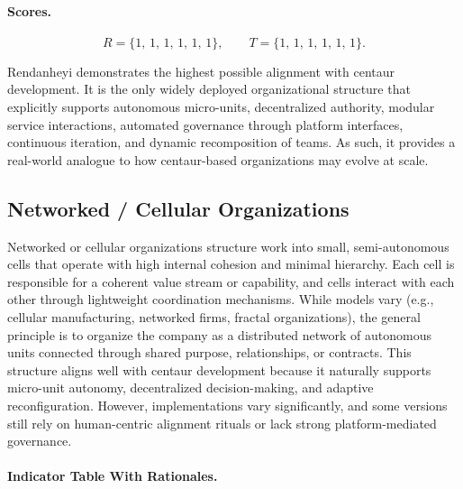 \documentclass[11pt, a4paper, twocolumn]{article} %
\begin{document}
\paragraph{Scores.}

\[
R = \{1,\,1,\,1,\,1,\,1,\,1\},
\qquad
T = \{1,\,1,\,1,\,1,\,1,\,1\}.
\]

Rendanheyi demonstrates the highest possible alignment with centaur development.
It is the only widely deployed organizational structure that explicitly supports
autonomous micro-units, decentralized authority, modular service interactions,
automated governance through platform interfaces, continuous iteration, and
dynamic recomposition of teams. As such, it provides a real-world analogue to
how centaur-based organizations may evolve at scale.

\newpage
\subsection*{Networked / Cellular Organizations}

Networked or cellular organizations structure work into small, semi-autonomous
cells that operate with high internal cohesion and minimal hierarchy. Each cell
is responsible for a coherent value stream or capability, and cells interact
with each other through lightweight coordination mechanisms. While models vary
(e.g., cellular manufacturing, networked firms, fractal organizations), the
general principle is to organize the company as a distributed network of
autonomous units connected through shared purpose, relationships, or contracts.
This structure aligns well with centaur development because it naturally
supports micro-unit autonomy, decentralized decision-making, and adaptive
reconfiguration. However, implementations vary significantly, and some versions
still rely on human-centric alignment rituals or lack strong platform-mediated
governance.

\paragraph{Indicator Table With Rationales.}
\end{document}
